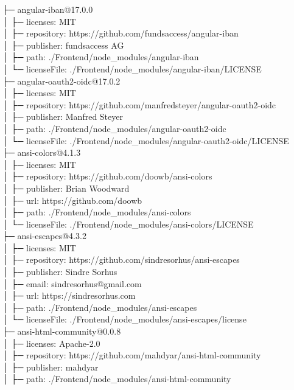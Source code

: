 ├─ angular-iban@17.0.0\\
│  ├─ licenses: MIT\\
│  ├─ repository: https://github.com/fundsaccess/angular-iban\\
│  ├─ publisher: fundsaccess AG\\
│  ├─ path: ./Frontend/node\_modules/angular-iban\\
│  └─ licenseFile: ./Frontend/node\_modules/angular-iban/LICENSE\\
├─ angular-oauth2-oidc@17.0.2\\
│  ├─ licenses: MIT\\
│  ├─ repository: https://github.com/manfredsteyer/angular-oauth2-oidc\\
│  ├─ publisher: Manfred Steyer\\
│  ├─ path: ./Frontend/node\_modules/angular-oauth2-oidc\\
│  └─ licenseFile: ./Frontend/node\_modules/angular-oauth2-oidc/LICENSE\\
├─ ansi-colors@4.1.3\\
│  ├─ licenses: MIT\\
│  ├─ repository: https://github.com/doowb/ansi-colors\\
│  ├─ publisher: Brian Woodward\\
│  ├─ url: https://github.com/doowb\\
│  ├─ path: ./Frontend/node\_modules/ansi-colors\\
│  └─ licenseFile: ./Frontend/node\_modules/ansi-colors/LICENSE\\
├─ ansi-escapes@4.3.2\\
│  ├─ licenses: MIT\\
│  ├─ repository: https://github.com/sindresorhus/ansi-escapes\\
│  ├─ publisher: Sindre Sorhus\\
│  ├─ email: sindresorhus@gmail.com\\
│  ├─ url: https://sindresorhus.com\\
│  ├─ path: ./Frontend/node\_modules/ansi-escapes\\
│  └─ licenseFile: ./Frontend/node\_modules/ansi-escapes/license\\
├─ ansi-html-community@0.0.8\\
│  ├─ licenses: Apache-2.0\\
│  ├─ repository: https://github.com/mahdyar/ansi-html-community\\
│  ├─ publisher: mahdyar\\
│  ├─ path: ./Frontend/node\_modules/ansi-html-community\\
